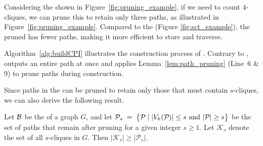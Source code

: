 

\begin{example}
  Considering the \cpi shown in Figure~\ref{fig:pruning_example}, if we need to count $4$-cliques, we can prune this \cpi to retain only three paths, as illustrated in Figure~\ref{fig:pruning_example}. Compared to the \sct(Figure \ref{fig:sct_example}), the pruned \cpi has fewer paths, making it more efficient to store and traverse.
\end{example}


Algorithm~\ref{alg:buildCPI} illustrates the construction process of \cpi. 
Contrary to \sct, \cpi outputs an entire path at once and applies Lemma~\ref{lem:path_pruning} (Line~6 $\&$ 9) to prune paths during construction.

Since paths in the \cpi can be pruned to retain only those that must contain $s$-cliques, we can also derive the following result.

\begin{theorem}
\label{thm:path_vs_clique}
Let $\mathcal{B}$ be the \cpi of a graph $G$, and let
$\mathcal P_s \;=\;
  \bigl\{\TPath{} \mid 
      |V_h(\TPath{})|\le s \text{ and } |\TPath{}|\ge s\bigr\}$
be the set of \cpi paths that remain after pruning for a given integer $s \ge 1$.
Let $\mathcal K_s$ denote the set of all $s$-cliques in $G$.
Then $|\mathcal K_s| \ge |\mathcal P_s|$.
\end{theorem}


